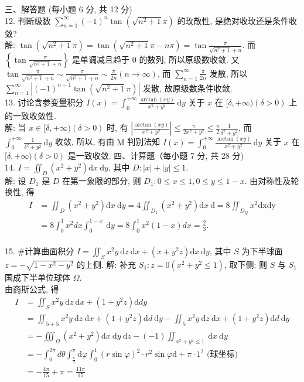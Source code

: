 \documentclass[a4paper,11pt,UTF8]{article}
\begin{document}
三、解答题 (每小题 6 分, 共 12 分)\\
12. 判断级数 $\sum_{n=1}^{\infty}(-1)^n \tan \left(\sqrt{n^2+1} \pi\right)$ 的玫散性, 是绝对收玫还是条件收敛?\\
解: $\tan \left(\sqrt{n^2+1} \pi\right)=\tan \left(\sqrt{n^2+1} \pi-n \pi\right)=\tan \frac{\pi}{\sqrt{n^2+1}+n}$.
而 $\left\{\tan \frac{\pi}{\sqrt{n^2+1}+n}\right\}$ 是单调减且趋于 0 的数列, 所以原级数收敛.
又 $\tan \frac{\pi}{\sqrt{n^2+1}+n} \sim \frac{\pi}{\sqrt{n^2+1}+n} \sim \frac{\pi}{2 n}(n \rightarrow \infty)$, 而 $\sum_{n=1}^{\infty} \frac{\pi}{2 n}$ 发散, 所以 $\sum_{n=1}^{\infty}\left|(-1)^{n-1} \tan \left(\sqrt{n^2+1} \pi\right)\right|$ 发散, 故原级数条件收敛.\\
13. 讨论含参变量积分 $I(x)=\int_0^{+\infty} \frac{\arctan (x y)}{x^2+y^2} \mathrm{~d} y$ 关于 $x$ 在 $[\delta,+\infty)(\delta>0)$ 上的一致收敛性.\\
解: 当 $x \in[\delta,+\infty)(\delta>0)$ 时, 有 $\left|\frac{\arctan (x y)}{x^2+y^2}\right| \leq \frac{\pi}{2 x^2+y^2} \leq \frac{\pi}{2} \frac{1}{\delta^2+y^2}$,
而 $\int_0^{+\infty} \frac{1}{\delta^2+y^2} \mathrm{~d} y$ 收敛, 所以, 有由 $\mathrm{M}$ 判别法知 $I(x)=\int_0^{+\infty} \frac{\arctan (x y)}{x^2+y^2} \mathrm{~d} y$ 关于 $x$ 在
$[\delta,+\infty)(\delta>0)$ 是一致收敛.
四、计算题（每小题 7 分, 共 28 分)\\
14. $I=\iint_D\left(x^2+y^2\right) \mathrm{d} x \mathrm{~d} y$, 其中 $D:|x|+|y| \leq 1$.\\
解: 设 $D_1$ 是 $D$ 在第一象限的部分, 则 $D_1: 0 \leq x \leq 1,0 \leq y \leq 1-x$.
由对称性及轮换性, 得
$$
\begin{aligned}
	I & =\iint_D\left(x^2+y^2\right) \mathrm{d} x \mathrm{~d} y=4 \iint_{D_1}\left(x^2+y^2\right) \mathrm{d} x \mathrm{~d}=8 \iint_{D_Q} x^2 \mathrm{dxdy} \\
	& =8 \int_0^1 x^2 d x \int_0^{1-x} \mathrm{~d} y=8 \int_0^1 x^2(1-x) d x=\frac{2}{3} .
\end{aligned}
$$\\
15. \#计算曲面积分 $I=\iint_S x^2 y \mathrm{~d} z \mathrm{~d} x+\left(x+y^2 z\right) \mathrm{d} x \mathrm{~d} y$, 其中 $S$ 为下半球面 $z=-\sqrt{1-x^2-y^2}$ 的上侧. 解: 补充 $S_1: z=0\left(x^2+y^2 \leq 1\right)$, 取下侧: 则 $S$ 与 $S_1$ 国成下半单位球体 $\Omega$.\\
由商斯公式, 得
$$
\begin{aligned}
	I & =\iint_S x^2 y \mathrm{~d} z \mathrm{~d} x+\left(1+y^2 z\right) \mathrm{d} d y \\
	& =\iint_{5+5} x^2 y \mathrm{~d} z \mathrm{~d} x+\left(1+y^2 z\right) \mathrm{d} d \mathrm{~d} y-\iint_5 x^2 y \mathrm{~d} z \mathrm{~d} x+\left(1+y^2 z\right) \mathrm{d} d \mathrm{~d} y \\
	& =-\iiint_{\Omega}\left(x^2+y^2\right) \mathrm{d} x \mathrm{~d} y \mathrm{~d} z-(-1) \iint_{x^2+y^2 \leq 1} \mathrm{~d} x \mathrm{~d} y \\
	& =-\int_0^{2 \pi} d \theta \int_{\frac{\pi}{2}}^\pi \mathrm{d} \varphi \int_0^1(r \sin \varphi)^2 \cdot r^2 \sin \varphi \mathrm{d}+\pi \cdot 1^2 \text { (球坐标) } \\
	& =-\frac{4 \pi}{15}+\pi=\frac{11 \pi}{15}
\end{aligned}
$$\\
\end{document}
